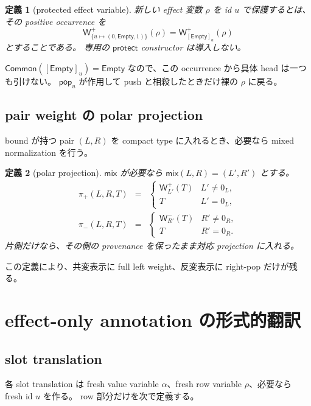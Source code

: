 \documentclass[uplatex,dvipdfmx,a4paper,10.5pt]{jsarticle}
\theoremstyle{jpplain}
\newtheorem{definition}{定義}[section]
\newcommand{\Empty}{\mathsf{Empty}}
\newcommand{\Common}{\mathsf{Common}}
\newcommand{\mix}{\mathsf{mix}}
\newcommand{\projp}{\pi_{+}}
\newcommand{\projn}{\pi_{-}}
\newcommand{\PWeight}[2]{\mathsf{W}^{+}_{#1}(#2)}
\newcommand{\NWeight}[2]{\mathsf{W}^{-}_{#1}(#2)}
\newcommand{\takeop}[2]{[#1]_{#2}}
\newcommand{\popop}[1]{\mathsf{pop}_{#1}}
\begin{document}
\begin{definition}[protected effect variable]
新しい effect 変数 $\rho$ を id $u$ で保護するとは、その positive occurrence を
\[
  \PWeight{\{u\mapsto(0,\Empty,1)\}}{\rho}
  =\PWeight{\takeop{\Empty}{u}}{\rho}
\]
とすることである。
専用の $\mathsf{protect}$ constructor は導入しない。
\end{definition}

$\Common(\takeop{\Empty}{u})=\Empty$ なので、この occurrence から具体 head は一つも引けない。
$\popop{u}$ が作用して push と相殺したときだけ裸の $\rho$ に戻る。

\subsection{pair weight の polar projection}

bound が持つ pair $(L,R)$ を compact type に入れるとき、必要なら mixed normalization を行う。

\begin{definition}[polar projection]
$\mix$ が必要なら $\mix(L,R)=(L',R')$ とする。
\[
\begin{array}{rcl}
\projp(L,R,T)&=&\begin{cases}
\PWeight{L'}{T}&L'\neq0_L,\\T&L'=0_L,
\end{cases}\\[1ex]
\projn(L,R,T)&=&\begin{cases}
\NWeight{R'}{T}&R'\neq0_R,\\T&R'=0_R.
\end{cases}
\end{array}
\]
片側だけなら、その側の provenance を保ったまま対応 projection に入れる。
\end{definition}

この定義により、共変表示に full left weight、反変表示に right-pop だけが残る。

\section{effect-only annotation の形式的翻訳}

\subsection{slot translation}

各 slot translation は fresh value variable $\alpha$、fresh row variable $\rho$、必要なら fresh id $u$ を作る。
row 部分だけを次で定義する。
\end{document}
